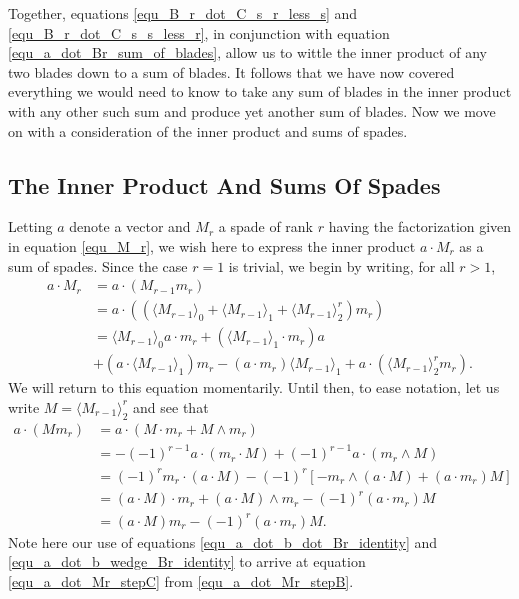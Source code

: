 \documentclass{birkjour}
\theoremstyle{definition}
\theoremstyle{remark}
\numberwithin{equation}{section}
\begin{document}
Together, equations \eqref{equ_B_r_dot_C_s_r_less_s} and \eqref{equ_B_r_dot_C_s_s_less_r}, in conjunction with equation
\eqref{equ_a_dot_Br_sum_of_blades}, allow us to wittle the inner product of any two blades down
to a sum of blades.  It follows that we have now covered everything we would need to know to take any sum of blades in the inner
product with any other such sum and produce yet another sum of blades.  Now we move on with a consideration
of the inner product and sums of spades.

\subsection{The Inner Product And Sums Of Spades}

Letting $a$ denote a vector and $M_r$ a spade of rank $r$ having the factorization
given in equation \eqref{equ_M_r},
we wish here to express the inner product $a\cdot M_r$ as a sum of spades.
Since the case $r=1$ is trivial, we begin by writing, for all $r>1$,
\begin{align}
a\cdot M_r &= a\cdot (M_{r-1}m_r)\nonumber \\
 &= a\cdot((\langle M_{r-1}\rangle_0 + \langle M_{r-1}\rangle_1 + \langle M_{r-1}\rangle_2^r)m_r)\nonumber \\
 &= \langle M_{r-1}\rangle_0a\cdot m_r + (\langle M_{r-1}\rangle_1\cdot m_r)a\nonumber \\
 &+ (a\cdot\langle M_{r-1}\rangle_1)m_r - (a\cdot m_r)\langle M_{r-1}\rangle_1 + a\cdot(\langle M_{r-1}\rangle_2^rm_r).\label{equ_a_dot_Mr_stepA}
\end{align}
We will return to this equation momentarily.  Until then, to ease notation, let us write $M=\langle M_{r-1}\rangle_2^r$ and see that
\begin{align}
a\cdot(Mm_r)
 &= a\cdot(M\cdot m_r + M\wedge m_r)\nonumber \\
 &= -(-1)^{r-1}a\cdot(m_r\cdot M) + (-1)^{r-1}a\cdot(m_r\wedge M)\label{equ_a_dot_Mr_stepB} \\
 &= (-1)^rm_r\cdot(a\cdot M) - (-1)^r\left[-m_r\wedge(a\cdot M)+(a\cdot m_r)M\right]\label{equ_a_dot_Mr_stepC} \\
 &= (a\cdot M)\cdot m_r + (a\cdot M)\wedge m_r - (-1)^r(a\cdot m_r)M\nonumber \\
 &= (a\cdot M)m_r - (-1)^r(a\cdot m_r)M.\label{equ_a_dot_Mr_stepD}
\end{align}
Note here our use of equations \eqref{equ_a_dot_b_dot_Br_identity} and \eqref{equ_a_dot_b_wedge_Br_identity} to
arrive at equation \eqref{equ_a_dot_Mr_stepC} from \eqref{equ_a_dot_Mr_stepB}.
\end{document}
